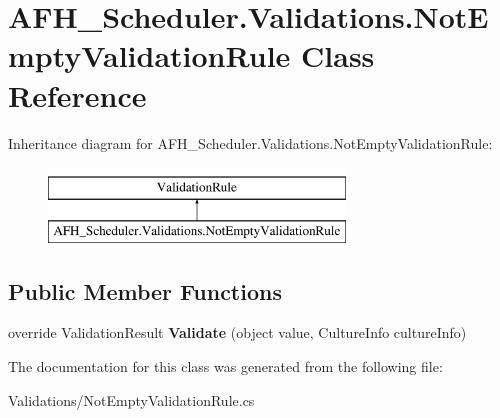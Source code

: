 \section{A\+F\+H\+\_\+\+Scheduler.\+Validations.\+Not\+Empty\+Validation\+Rule Class Reference}
\label{class_a_f_h___scheduler_1_1_validations_1_1_not_empty_validation_rule}
Inheritance diagram for A\+F\+H\+\_\+\+Scheduler.\+Validations.\+Not\+Empty\+Validation\+Rule\+:\begin{figure}[H]
\begin{center}
\leavevmode
\includegraphics[height=2.000000cm]{class_a_f_h___scheduler_1_1_validations_1_1_not_empty_validation_rule}
\end{center}
\end{figure}
\subsection*{Public Member Functions}
\begin{DoxyCompactItemize}
\item 
\mbox{\label{class_a_f_h___scheduler_1_1_validations_1_1_not_empty_validation_rule_ae13e2084a19fa17d30ca542b0f2046c3}} 
override Validation\+Result {\bfseries Validate} (object value, Culture\+Info culture\+Info)
\end{DoxyCompactItemize}


The documentation for this class was generated from the following file\+:\begin{DoxyCompactItemize}
\item 
Validations/Not\+Empty\+Validation\+Rule.\+cs\end{DoxyCompactItemize}
